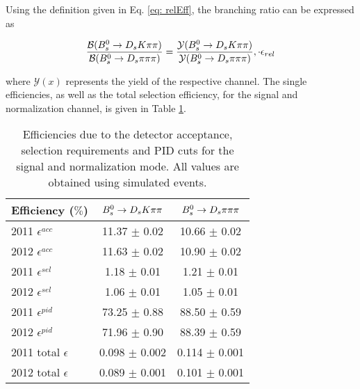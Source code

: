  Using the definition given in Eq. \ref{eq: relEff}, the branching ratio can be expressed as

\begin{equation}
\frac{\mathcal{B}({{B}^0_{s}}\rightarrow{\ensuremath{{D}_{s}}}{\ensuremath{K}}{\ensuremath{\pi}}{\ensuremath{\pi}})}{\mathcal{B}({{B}^0_{s}}\rightarrow{\ensuremath{{D}_{s}}}{\ensuremath{\pi}}{\ensuremath{\pi}}{\ensuremath{\pi}})} = \frac{\mathcal{Y}({{B}^0_{s}}\rightarrow{\ensuremath{{D}_{s}}}{\ensuremath{K}}{\ensuremath{\pi}}{\ensuremath{\pi}})}{\mathcal{Y}({{B}^0_{s}}\rightarrow{\ensuremath{{D}_{s}}}{\ensuremath{\pi}}{\ensuremath{\pi}}{\ensuremath{\pi}})},
\cdot \epsilon_{rel}
\label{eq: BRwEff}
\end{equation} 

where $\mathcal{Y}(x)$ represents the yield of the respective channel. \newline
The single efficiencies, as well as the total selection efficiency, for the signal and normalization channel, is given in Table \ref{tab: effTab}.

\begin{table}[h!]
\centering
\begin{tabular}{l c c}
Efficiency ($\%$) & ${{B}^0_{s}}\rightarrow{\ensuremath{{D}_{s}}}{\ensuremath{K}}{\ensuremath{\pi}}{\ensuremath{\pi}}$ & ${{B}^0_{s}}\rightarrow{\ensuremath{{D}_{s}}}{\ensuremath{\pi}}{\ensuremath{\pi}}{\ensuremath{\pi}}$\\
\hline
2011 $\epsilon^{acc}$ & 11.37 $\pm$ 0.02 & 10.66 $\pm$ 0.02\\
2012 $\epsilon^{acc}$ & 11.63 $\pm$ 0.02 & 10.90 $\pm$ 0.02\\
2011 $\epsilon^{sel}$ & 1.18 $\pm$ 0.01& 1.21 $\pm$ 0.01\\
2012 $\epsilon^{sel}$ & 1.06 $\pm$ 0.01& 1.05 $\pm$ 0.01\\
2011 $\epsilon^{pid}$ & 73.25 $\pm$ 0.88 & 88.50 $\pm$ 0.59\\
2012 $\epsilon^{pid}$ & 71.96 $\pm$ 0.90 & 88.39 $\pm$ 0.59\\
\hline
2011 total $\epsilon$ & 0.098 $\pm$  0.002& 0.114 $\pm$ 0.001\\
2012 total $\epsilon$ & 0.089 $\pm$  0.001& 0.101 $\pm$ 0.001\\
\hline
\end{tabular}
\caption{Efficiencies due to the detector acceptance, selection requirements and PID cuts for the signal and normalization mode. All values are obtained using simulated events.}
\label{tab: effTab}
\end{table}





